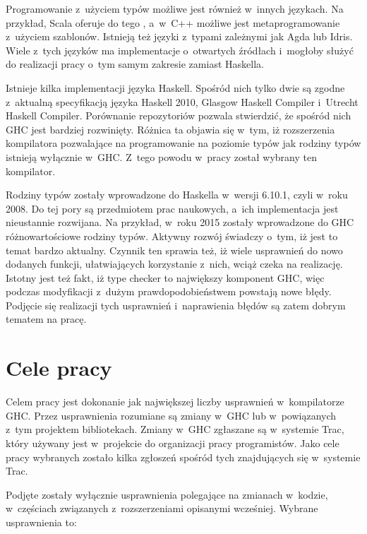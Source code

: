 Programowanie z~użyciem typów możliwe jest również w~innych językach. Na przykład,
Scala oferuje do tego , a~w~C++ możliwe jest
metaprogramowanie z~użyciem szablonów. Istnieją też języki z~typami zależnymi
jak Agda lub Idris. Wiele z~tych języków ma implementacje o~otwartych źródłach
i~mogłoby służyć do realizacji pracy o~tym samym zakresie zamiast Haskella.

Istnieje kilka implementacji języka Haskell. Spośród nich tylko dwie są zgodne
z~aktualną specyfikacją języka Haskell 2010, Glasgow Haskell Compiler i~Utrecht
Haskell Compiler\cite{WikiImplementations}. Porównanie repozytoriów pozwala
stwierdzić, że spośród nich GHC jest bardziej rozwinięty. Różnica ta objawia się
w~tym, iż rozszerzenia kompilatora pozwalające na programowanie na poziomie
typów jak rodziny typów istnieją wyłącznie w~GHC\cite{UHCUserGuide}. Z~tego
powodu w~pracy został wybrany ten kompilator.

Rodziny typów zostały wprowadzone do Haskella w~wersji 6.10.1, czyli w~roku
2008\cite{WikiIndexedTypes}. Do tej pory są przedmiotem prac naukowych, a~ich implementacja jest
nieustannie rozwijana. Na przykład, w~roku 2015 zostały wprowadzone do GHC
różnowartościowe rodziny typów\cite{WikiInjectiveTypeFamilies}.
Aktywny rozwój świadczy o~tym, iż jest to
temat bardzo aktualny. Czynnik ten sprawia też, iż wiele usprawnień do
nowo dodanych funkcji, ułatwiających korzystanie z~nich, wciąż czeka na realizację.
Istotny jest też fakt, iż type checker to największy komponent GHC\cite{AOSA},
więc podczas modyfikacji z~dużym prawdopodobieństwem powstają nowe błędy.
Podjęcie się realizacji tych usprawnień i~naprawienia błędów są zatem dobrym tematem na pracę.

\section{Cele pracy}\label{sec:cele_pracy}

Celem pracy jest dokonanie jak największej liczby usprawnień w~kompilatorze
GHC. Przez usprawnienia rozumiane są zmiany w~GHC lub w~powiązanych z~tym
projektem bibliotekach. Zmiany w~GHC zgłaszane są w~systemie Trac, który
używany jest w~projekcie do organizacji pracy programistów. Jako cele pracy
wybranych zostało kilka zgłoszeń spośród tych znajdujących się w~systemie Trac.

Podjęte zostały wyłącznie usprawnienia polegające na zmianach
w~kodzie, w~częściach związanych z~rozszerzeniami opisanymi wcześniej. Wybrane
usprawnienia to:

